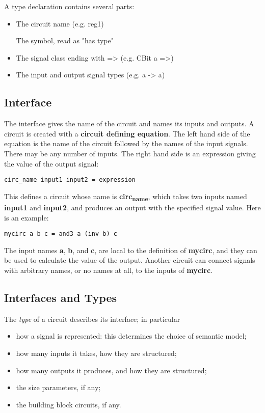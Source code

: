 \documentclass[11pt]{article}
\begin{document}
A type declaration contains several parts:

\begin{itemize}
\item The circuit name (e.g. reg1)
\item[{The}] symbol, read as "has type"
\item The signal class ending with => (e.g. CBit a =>)
\item The input and output signal types (e.g. a -> a)
\end{itemize}

\subsection{Interface}
\label{sec:orgc0df7e4}

The interface gives the name of the circuit and names its inputs and
outputs.  A circuit is created with a \textbf{circuit defining equation}.
The left hand side of the equation is the name of the circuit followed
by the names of the input signals.  There may be any number of inputs.
The right hand side is an expression giving the value of the output
signal:


\begin{verbatim}
circ_name input1 input2 = expression
\end{verbatim}

This defines a circuit whose name is \textbf{circ\textsubscript{name}}, which takes two
inputs named \textbf{input1} and \textbf{input2}, and produces an output with the
specified signal value.  Here is an example:

\begin{verbatim}
mycirc a b c = and3 a (inv b) c
\end{verbatim}


The input names \textbf{a}, \textbf{b}, and \textbf{c}, are local to the definition of
\textbf{mycirc}, and they can be used to calculate the value of the output.
Another circuit can connect signals with arbitrary names, or no names
at all, to the inputs of \textbf{mycirc}.

\subsection{Interfaces and Types}
\label{sec:org26fa399}

The \emph{type} of a circuit describes its interface; in particular

\begin{itemize}
\item how a signal is represented: this determines the choice of
semantic model;
\item how many inputs it takes, how they are structured;
\item how many outputs it produces, and how they are structured;
\item the size parameters, if any;
\item the building block circuits, if any.
\end{itemize}
\end{document}
